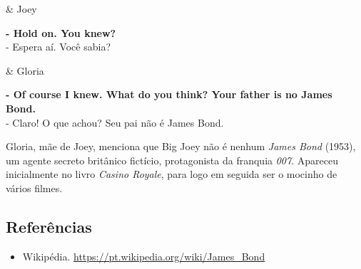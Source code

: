 \begin{tcolorbox}[enhanced,center upper,
    drop fuzzy shadow southeast, boxrule=0.3pt,
    lower separated=false,
    colframe=black!30!dialogoBorder,colback=white]
\begin{minipage}[c]{0.16\linewidth}
   & \centering \scriptsize{Joey}
\end{minipage}
\hfill
\begin{minipage}[c]{0.8\linewidth}
  \textbf{- Hold on. You knew?}\\
  - Espera aí. Você sabia?
\end{minipage}

\medskip
\begin{minipage}[c]{0.16\linewidth}
   & \centering \scriptsize{Gloria}
\end{minipage}
\hfill
\begin{minipage}[c]{0.8\linewidth}
  \textbf{- Of course I knew. What do you think? Your father is no James Bond.}\\
  - Claro! O que achou? Seu pai não é James Bond.
\end{minipage}
\end{tcolorbox}

Gloria, mãe de Joey, menciona que Big Joey não é nenhum \emph{James
Bond} (1953), um agente secreto britânico fictício, protagonista da
franquia \emph{007}. Apareceu inicialmente no livro \emph{Casino
Royale}, para logo em seguida ser o mocinho de vários filmes.

\hypertarget{referuxeancias-2}{%
\subsection{Referências}\label{referuxeancias-2}}

\begin{itemize}
\tightlist
\item
  \sloppy Wikipédia. \url{https://pt.wikipedia.org/wiki/James_Bond}
\end{itemize}

